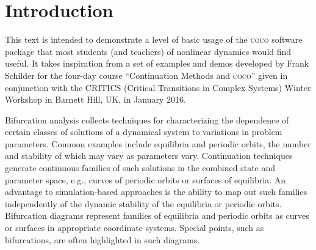  

\section{Introduction}
\label{chap: intro}

This text is intended to demonstrate a level of basic usage of the \textsc{coco} software package that most students (and teachers) of nonlinear dynamics would find useful. It takes inspiration from a set of examples and demos developed by Frank Schilder for the four-day course ``Continuation Methods and \textsc{coco}'' given in conjunction with the CRITICS (Critical Transitions in Complex Systems) Winter Workshop in Barnett Hill, UK, in January 2016.

Bifurcation analysis collects techniques for characterizing the dependence of certain classes of solutions of a dynamical system to variations in problem parameters. Common examples include equilibria and periodic orbits, the number and stability of which may vary as parameters vary. Continuation techniques generate continuous families of such solutions in the combined state and parameter space, e.g., curves of periodic orbits or surfaces of equilibria. An advantage to simulation-based approaches is the ability to map out such families independently of the dynamic stability of the equilibria or periodic orbits. Bifurcation diagrams represent families of equilibria and periodic orbits as curves or surfaces in appropriate coordinate systems. Special points, such as bifurcations, are often highlighted in such diagrams.

